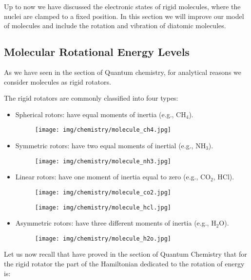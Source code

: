 	Up to now we have discussed the electronic states of rigid molecules, where the nuclei are clamped to a fixed position. In this section we will improve our model of molecules and include the rotation and vibration of diatomic molecules.

	\pagebreak
	\subsection{Molecular Rotational Energy Levels}\label{molecular rotational energy levels}
	As we have seen in the section of Quantum chemistry, for analytical reasons we consider molecules as rigid rotators.

	The rigid rotators are commonly classified into four types:
	\begin{itemize}
		\item Spherical rotors: have equal moments of inertia (e.g., $\mathrm{CH}_4$).
		\begin{figure}[H]
			\centering
			\texttt{[image: img/chemistry/molecule\_ch4.jpg]}
		\end{figure}
		
		\item Symmetric rotors: have two equal moments of inertial (e.g., $\mathrm{NH}_3$).
		\begin{figure}[H]
			\centering
			\texttt{[image: img/chemistry/molecule\_nh3.jpg]}
		\end{figure}
		
		\item Linear rotors: have one moment of inertia equal to zero (e.g., $\mathrm{CO_2}$, $\mathrm{HCl}$).
		\begin{figure}[H]
			\centering
			\texttt{[image: img/chemistry/molecule\_co2.jpg]}
		\end{figure}
		\begin{figure}[H]
			\centering
			\texttt{[image: img/chemistry/molecule\_hcl.jpg]}
		\end{figure}

		\item Asymmetric rotors: have three different moments of inertia (e.g., $\mathrm{H}_2\mathrm{O}$).
		\begin{figure}[H]
			\centering
			\texttt{[image: img/chemistry/molecule\_h2o.jpg]}
		\end{figure}
	\end{itemize}
	Let us now recall that have proved in the section of Quantum Chemistry that for the rigid rotator the part of the Hamiltonian dedicated to the rotation of energy is:
	
